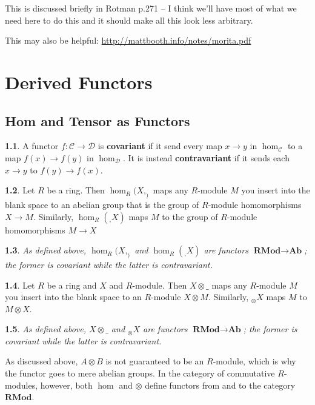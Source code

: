 \documentclass[oneside,english]{amsbook}
\numberwithin{section}{chapter}
\theoremstyle{plain}
\newtheorem{thm}{\protect\theoremname}
\theoremstyle{definition}
\newtheorem{defn}[thm]{\protect\definitionname}
\providecommand{\definitionname}{Definition}
\providecommand{\theoremname}{Theorem}
\begin{document}
			This is discussed briefly in Rotman p.271 -- I think we'll have most of what we need here to do this and it should make all this look less arbitrary.
			
			This may also be helpful: \url{http://mattbooth.info/notes/morita.pdf}
		
	\chapter{Derived Functors}
	
		\section{Hom and Tensor as Functors}

			\begin{defn}
				A functor $f:\mathscr{C}\to \mathscr{D}$ is \textbf{covariant} if it send every map $x\to y$ in $\hom_\mathscr{C}$ to a map $f(x)\to f(y)$ in $\hom_\mathscr{D}$. It is instead \textbf{contravariant} if it sends each  $x\to y$ to $f(y)\to f(x)$.
			\end{defn}
			
			\begin{defn}
				Let $R$ be a ring. Then $\hom_R(X, _)$ maps any $R$-module $M$ you insert into the blank space to an abelian group that is the group of $R$-module homomorphisms $X\to M$. Similarly, $\hom_R(_, X)$ maps $M$ to the group of $R$-module homomorphisms $M\to X$
			\end{defn}
			
			\begin{thm}
				As defined above, $\hom_R(X, _)$ and $\hom_R(_, X)$ are functors $\textbf{RMod}\to \textbf{Ab}$; the former is covariant while the latter is contravariant.
			\end{thm}
			
			\begin{defn}
				Let $R$ be a ring and $X$ and $R$-module. Then $X\otimes \_ $ maps any $R$-module $M$ you insert into the blank space to an $R$-module $X\otimes M$. Similarly, $_\otimes X$ maps $M$ to $M\otimes X$.
			\end{defn}
			
			\begin{thm}
				As defined above, $X\otimes \_$ and $_\otimes X$ are functors  $\textbf{RMod}\to \textbf{Ab}$; the former is covariant while the latter is contravariant.
			\end{thm}
			
			As discussed above, $A\otimes B$ is not guaranteed to be an $R$-module, which is why the functor goes to mere abelian groups. In the category of commutative $R$-modules, however, both $\hom$ and $\otimes$ define functors from and to the category $\textbf{RMod}$.
			
\end{document}
